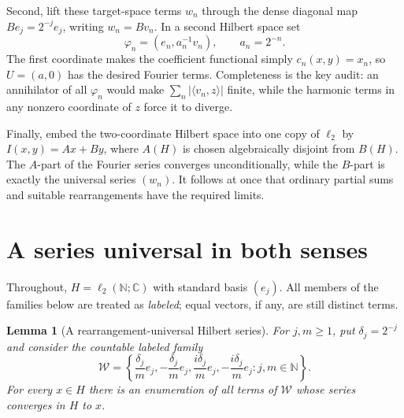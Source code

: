 \documentclass[11pt]{article}
\newtheorem{lemma}[theorem]{Lemma}
\newcommand{\N}{\mathbb N}
\newcommand{\C}{\mathbb C}
\newcommand{\cW}{\mathcal W}
\newcommand{\ip}[2]{\langle #1,#2\rangle}
\begin{document}
Second, lift these target-space terms $w_n$ through the dense diagonal map
$B e_j=2^{-j}e_j$, writing $w_n=Bv_n$.  In a second Hilbert space set
\[
  \varphi_n=(e_n,a_n^{-1}v_n),\qquad a_n=2^{-n}.
\]
The first coordinate makes the coefficient functional simply
$c_n(x,y)=x_n$, so $U=(a,0)$ has the desired Fourier terms.  Completeness is
the key audit: an annihilator of all $\varphi_n$ would make
$\sum_n|\ip{v_n}{z}|$ finite, while the harmonic terms in any nonzero
coordinate of $z$ force it to diverge.

Finally, embed the two-coordinate Hilbert space into one copy of $\ell_2$ by
$I(x,y)=Ax+By$, where $A(H)$ is chosen algebraically disjoint from $B(H)$.
The $A$-part of the Fourier series converges unconditionally, while the
$B$-part is exactly the universal series $(w_n)$.  It follows at once that
ordinary partial sums and suitable rearrangements have the required limits.

\section{A series universal in both senses}

Throughout, $H=\ell_2(\N;\C)$ with standard basis $(e_j)$.  All members of
the families below are treated as \emph{labeled}; equal vectors, if any, are
still distinct terms.

\begin{lemma}[A rearrangement-universal Hilbert series]\label{lem:rearr}
For $j,m\geq1$, put $\delta_j=2^{-j}$ and consider the countable labeled
family
\[
 \cW=\left\{
  \frac{\delta_j}{m}e_j,-\frac{\delta_j}{m}e_j,
  \frac{i\delta_j}{m}e_j,-\frac{i\delta_j}{m}e_j:
  j,m\in\N
 \right\}.
\]
For every $x\in H$ there is an enumeration of all terms of $\cW$ whose series
converges in $H$ to $x$.
\end{lemma}
\end{document}

